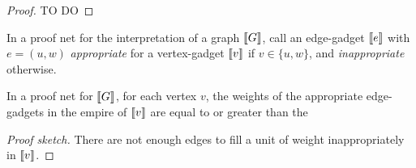 \begin{proof}
TO DO
\end{proof}


In a proof net for the interpretation of a graph $\llbracket G\rrbracket$, call an edge-gadget $\llbracket e\rrbracket$ with $e=(u,w)$ \emph{appropriate} for a vertex-gadget $\llbracket v\rrbracket$ if $v\in\{u,w\}$, and \emph{inappropriate} otherwise.


\begin{lemma}
In a proof net for $\llbracket G\rrbracket$, for each vertex $v$, the weights of the appropriate edge-gadgets in the empire of $\llbracket v\rrbracket$ are equal to or greater than the 

\end{lemma}



\begin{proof}[Proof sketch]
There are not enough edges to fill a unit of weight inappropriately in $\llbracket v\rrbracket$.
\end{proof}














